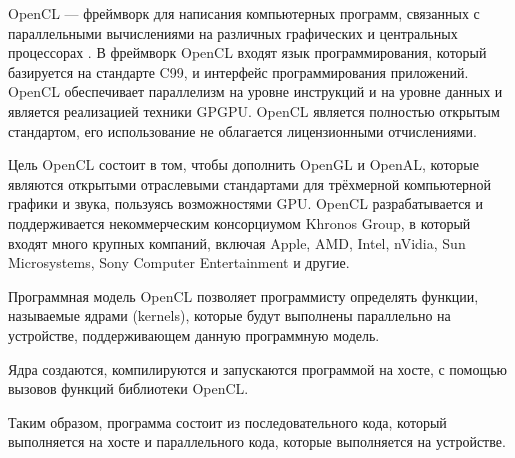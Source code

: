 OpenCL  — фреймворк для 
написания компьютерных программ, связанных с параллельными вычислениями на различных графических 
 и центральных процессорах . В фреймворк OpenCL входят язык программирования, 
который базируется на стандарте C99, и интерфейс программирования приложений. OpenCL 
обеспечивает параллелизм на уровне инструкций и на уровне данных и является реализацией техники GPGPU. 
OpenCL является полностью открытым стандартом, его использование не облагается лицензионными отчислениями.

Цель OpenCL состоит в том, чтобы дополнить OpenGL и OpenAL, которые являются открытыми отраслевыми 
стандартами для трёхмерной компьютерной графики и звука, пользуясь возможностями GPU. OpenCL разрабатывается 
и поддерживается некоммерческим консорциумом Khronos Group, в который входят много крупных компаний, 
включая Apple, AMD, Intel, nVidia, Sun Microsystems, Sony Computer Entertainment и другие.

Программная модель OpenCL
\cite{OpenCL:Specification, OpenCL:programming-guide, OpenCL:jump-start}
позволяет программисту определять функции, называемые
ядрами (kernels), которые будут выполнены параллельно на устройстве,
поддерживающем данную программную модель.

Ядра создаются, компилируются и запускаются программой на хосте, с помощью
вызовов функций библиотеки OpenCL.

Таким образом, программа состоит из последовательного кода, который выполняется
на хосте и параллельного кода, которые выполняется на устройстве.